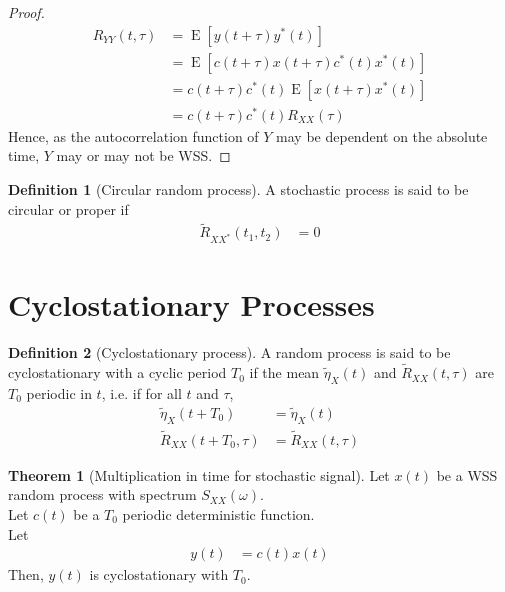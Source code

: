 \documentclass[titlepage, fleqn, a4paper, 12pt, twoside]{article}
\theoremstyle{definition}
\newtheorem{definition}{Definition}
\theoremstyle{theorem}
\newtheorem{theorem}{Theorem}
\renewcommand{\tilde}{\widetilde}
\DeclareMathOperator{\expct}{\mathrm{E}}
\begin{document}
\begin{proof}
	\begin{align*}
		R_{Y Y}(t,\tau) &= \expct\left[ y(t + \tau) y^*(t) \right]\\
		&= \expct\left[ c(t + \tau) x(t + \tau) c^*(t) x^*(t) \right]\\
		&= c(t + \tau) c^*(t) \expct\left[ x(t + \tau) x^*(t) \right]\\
		&= c(t + \tau) c^*(t) R_{X X}(\tau)
	\end{align*}
	Hence, as the autocorrelation function of $Y$ may be dependent on the absolute time, $Y$ may or may not be WSS.
\end{proof}

\begin{definition}[Circular random process]
	A stochastic process is said to be circular or proper if
	\begin{align*}
		\tilde{R}_{X X^*}(t_1,t_2) &= 0
	\end{align*}
	\label{def:circular_random_process}
\end{definition}

\section{Cyclostationary Processes}

\begin{definition}[Cyclostationary process]
	A random process is said to be cyclostationary with a cyclic period $T_0$ if the mean $\tilde{\eta}_X(t)$ and $\tilde{R}_{X X}(t,\tau)$ are $T_0$ periodic in $t$, i.e. if for all $t$ and $\tau$,
	\begin{align*}
		\tilde{\eta}_X(t + T_0) &= \tilde{\eta}_X(t)\\
		\tilde{R}_{X X}(t + T_0,\tau) &= \tilde{R}_{X X}(t,\tau)
	\end{align*}
\end{definition}

\begin{theorem}[Multiplication in time for stochastic signal]
	Let $x(t)$ be a WSS random process with spectrum $S_{X X}(\omega)$.\\
	Let $c(t)$ be a $T_0$ periodic deterministic function.\\
	Let
	\begin{align*}
		y(t) &= c(t) x(t)
	\end{align*}
	Then, $y(t)$ is cyclostationary with $T_0$.
	\label{thm:multiplication_in_time_for_stochastic_signal_and_periodic_deterministic_signal}
\end{theorem}
\end{document}
